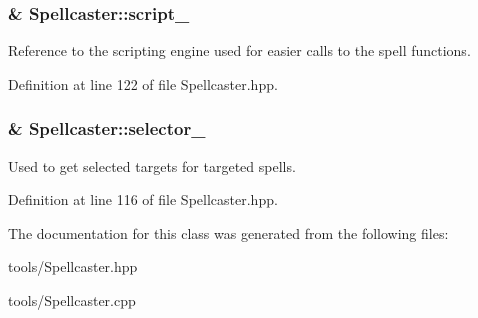 \subsubsection[{\texorpdfstring{script\+\_\+}{script_}}]{\& Spellcaster\+::script\+\_\+\hspace{0.3cm}{\ttfamily [private]}}\hypertarget{class_spellcaster_a7eb799aff1aff16e7eb5c319eaf1bb1c}{}\label{class_spellcaster_a7eb799aff1aff16e7eb5c319eaf1bb1c}


Reference to the scripting engine used for easier calls to the spell functions. 



Definition at line 122 of file Spellcaster.\+hpp.

\subsubsection[{\texorpdfstring{selector\+\_\+}{selector_}}]{\& Spellcaster\+::selector\+\_\+\hspace{0.3cm}{\ttfamily [private]}}\hypertarget{class_spellcaster_af3aeccdb061ff26b308d3147d1fb8e4f}{}\label{class_spellcaster_af3aeccdb061ff26b308d3147d1fb8e4f}


Used to get selected targets for targeted spells. 



Definition at line 116 of file Spellcaster.\+hpp.



The documentation for this class was generated from the following files\+:\begin{DoxyCompactItemize}
\item 
tools/Spellcaster.\+hpp\item 
tools/Spellcaster.\+cpp\end{DoxyCompactItemize}
